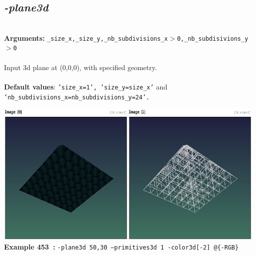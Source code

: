 \documentclass[a4paper,11pt,twoside]{book}
\begin{document}
\subsection{\emph{-plane3d} }\vspace*{-0.5em}
~\\\textbf{Arguments: } 
{\small \texttt{\_size\_x,\_size\_y,\_nb\_subdivisions\_x$>$0,\_nb\_subdisivions\_y$>$0}}\\~\\
Input 3d plane at (0,0,0), with specified geometry.
~\\~\\\textbf{Default values}: {\small \texttt{'size\_x=1', 'size\_y=size\_x'} and \texttt{'nb\_subdivisions\_x=nb\_subdivisions\_y=24'.}}
\begin{center}\includegraphics[keepaspectratio=true,height=7cm,width=\textwidth]{img/gmic_def453.jpg}\\
{\footnotesize \textbf{Example 453~:} \texttt{-plane3d 50,30 --primitives3d 1 -color3d[-2] @\{-RGB\}}}
\end{center}
\end{document}
